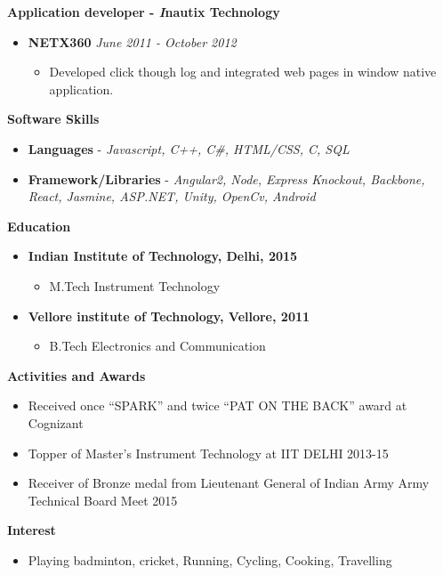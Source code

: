 \documentclass[a4paper,10pt]{article}
\begin{document}
\textbf{Application developer - \textit Inautix Technology}\\
    \begin{itemize}
\item[] \textbf {NETX360} \quad \textit{June 2011 - October 2012}
    \begin{itemize}
        \item [] Developed click though log and integrated web pages in window native application.
    \end{itemize}
\end{itemize}

\textbf{Software Skills}\\
    \begin{itemize}
        \item[] \textbf{Languages} - \textit{ Javascript, C++, C\#, HTML/CSS, C, SQL}
        \item[] \textbf{Framework/Libraries} - \textit{ Angular2, Node, Express Knockout, Backbone, React, Jasmine, ASP.NET, Unity, OpenCv, Android}
    \end{itemize}

\textbf{Education}\\
    \begin{itemize}
        \item [] \textbf{Indian Institute of Technology, Delhi, 2015}
            \begin{itemize}
                \item[] M.Tech Instrument Technology
            \end{itemize}
            \item[]\textbf{Vellore institute of Technology, Vellore, 2011}
                \begin{itemize}
                    \item[] B.Tech Electronics and Communication
                \end{itemize}
    \end{itemize}

\textbf{Activities and Awards}\\
    \begin{itemize}
        \item[] Received once “SPARK” and twice “PAT ON THE BACK” award at Cognizant
        \item[] Topper of Master’s Instrument Technology at IIT DELHI 2013-15
        \item[] Receiver of Bronze medal from Lieutenant General of Indian Army Army Technical Board Meet 2015
    \end{itemize}

\textbf{Interest}\\
    \begin{itemize}
        \item [] Playing badminton, cricket, Running, Cycling, Cooking, Travelling
    \end{itemize}
\end{document}

